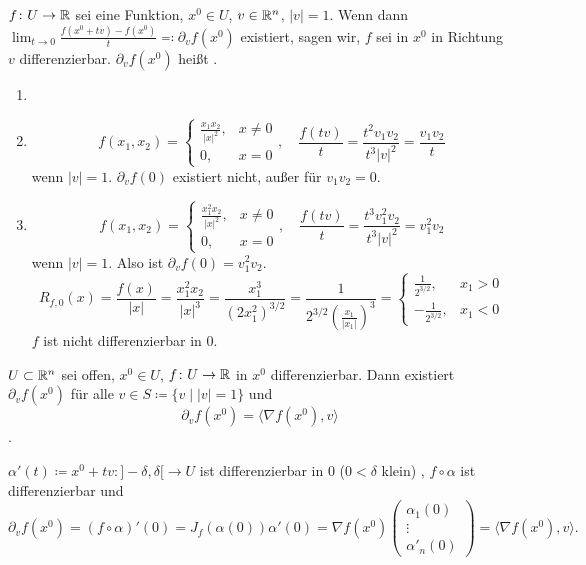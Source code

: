 \newpage
\begin{definition}
	$ f\colon U\rightarrow\mathbb{R} $ sei eine Funktion, $ x^0\in U $, $ v\in\mathbb{R}^n $, $ |v|=1 $. Wenn dann $ \lim_{t\to 0}\frac{f(x^0+tv)-f(x^0)}{t}\eqqcolon\partial_v f(x^0) $ existiert, sagen wir, $ f $ sei in $ x^0 $ in Richtung $ v $ differenzierbar. $ \partial_v f(x^0) $ hei\ss t . 
\end{definition}
\begin{beispiel*}
	\begin{enumerate}
		\item []
		\item 	\[ f(x_1,x_2)=\begin{cases}
		\frac{x_1x_2}{|x|^2},&x\neq 0\\
		0,&x=0
		\end{cases},\quad \frac{f(tv)}{t}=\frac{t^2v_1v_2}{t^3|v|^2}=\frac{v_1v_2}{t} \]
		wenn $ |v|=1 $. $ \partial_v f(0) $ existiert nicht, au\ss er f\"ur $ v_1v_2=0 $.
		\item \[ f(x_1,x_2)=\begin{cases}
		\frac{x_1^2x_2}{|x|^2},&x\neq 0\\0,&x=0
		\end{cases},\quad \frac{f(tv)}{t}=\frac{t^3v_1^2v_2}{t^3|v|^2}=v_1^2v_2 \]
		wenn $ |v|=1 $. Also ist $ \partial_v f(0)=v_1^2v_2 $.
		\[ R_{f,0}(x)=\frac{f(x)}{|x|}=\frac{x_1^2x_2}{|x|^3}=
		\frac{x_1^3}{(2x_1^2)^{3/2}}=\frac{1}{2^{3/2}\left(\frac{x_1}{|x_1|}\right)^3}=\begin{cases}
		\frac{1}{2^{3/2}},&x_1>0\\-\frac{1}{2^{3/2}},&x_1<0
		\end{cases} \]
		$ f $ ist nicht differenzierbar in $ 0 $.
	\end{enumerate}
\end{beispiel*}
\begin{lemma}
	$ U\subset\mathbb{R}^n $ sei offen, $ x^0\in U $, $ f\colon U\rightarrow\mathbb{R} $ in $ x^0 $ differenzierbar. Dann existiert $ \partial_v f(x^0) $ f\"ur alle $ v\in S\coloneqq\lbrace v\mid |v|=1\rbrace $ und \[ \partial_v f(x^0)=\langle\nabla f(x^0),v\rangle \].
\end{lemma}
\begin{beweis}
	$ \alpha'(t)\coloneqq x^0+tv\colon]-\delta,\delta[\rightarrow U $ ist differenzierbar in $ 0 $ ($ 0<\delta $ klein) , $ f\circ\alpha $ ist differenzierbar und
	\[ \partial_v f(x^0)=(f\circ\alpha)'(0)=J_f(\alpha(0))\alpha'(0)=\nabla f(x^0)\begin{pmatrix}
	\alpha_1(0)\\\vdots\\\alpha'_n(0)
	\end{pmatrix}=\langle\nabla f(x^0),v\rangle. \]
\end{beweis}
